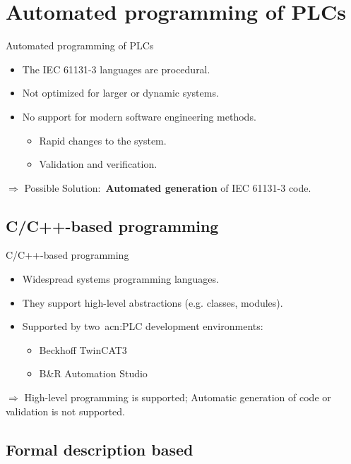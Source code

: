 \documentclass[18pt]{beamer}
\begin{document}
\section{Automated programming of PLCs}

\begin{frame}{Automated programming of PLCs}
    \begin{itemize}
        \item The IEC 61131-3 languages are procedural.
        \item Not optimized for larger or dynamic systems.
        \item No support for modern software engineering methods.
        \begin{itemize}
            \item Rapid changes to the system.
            \item Validation and verification.
        \end{itemize}
    \end{itemize}
    $\Rightarrow$ Possible Solution:~\textbf{Automated generation} of IEC 61131-3 code.
\end{frame}

\subsection{C/C++-based programming}

\begin{frame}{C/C++-based programming}
\begin{itemize}
	\item Widespread systems programming languages.
    \item They support high-level abstractions (e.g. classes, modules).
    \item Supported by two~\acrshort{acn:PLC} development environments:
    \begin{itemize}
        \item Beckhoff TwinCAT3 
        \item B\&R Automation Studio
    \end{itemize}
\end{itemize}
\pause
$\Rightarrow$ High-level programming is supported; Automatic generation of code or validation is not supported.
\end{frame}

\subsection{Formal description based}
\end{document}
